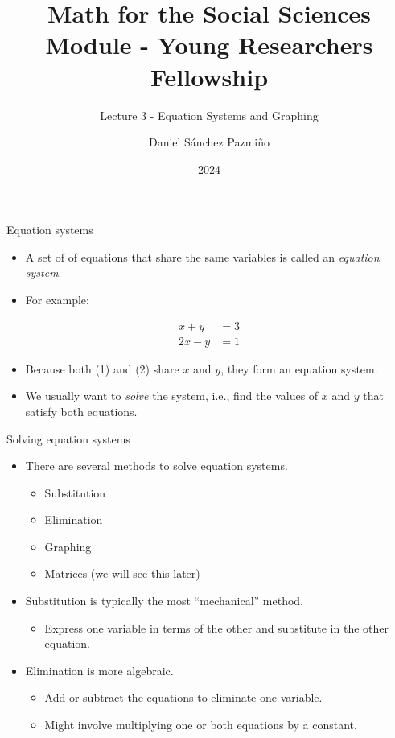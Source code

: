 \documentclass[
  10pt,
  ignorenonframetext,
]{beamer}
\title{Math for the Social Sciences Module - Young Researchers
Fellowship}
\subtitle{Lecture 3 - Equation Systems and Graphing}
\author{Daniel Sánchez Pazmiño}
\date{2024}
\institute{Laboratorio de Investigación para el Desarrollo del Ecuador}
\providecommand{\tightlist}{%
  \setlength{\itemsep}{0pt}\setlength{\parskip}{0pt}}\usepackage{longtable,booktabs,array}
\begin{document}
\frame{\titlepage}

\begin{frame}{Equation systems}
\label{equation-systems}
\begin{itemize}
\item
  A set of of equations that share the same variables is called an
  \emph{equation system}.
\item
  For example:
\end{itemize}

\begin{align}
x + y &= 3 \\
2x - y &= 1
\end{align}

\begin{itemize}
\item
  Because both (1) and (2) share \(x\) and \(y\), they form an equation
  system.
\item
  We usually want to \emph{solve} the system, i.e., find the values of
  \(x\) and \(y\) that satisfy both equations.
\end{itemize}
\end{frame}

\begin{frame}{Solving equation systems}
\label{solving-equation-systems}
\begin{itemize}
\tightlist
\item
  There are several methods to solve equation systems.

  \begin{itemize}
  \tightlist
  \item
    Substitution
  \item
    Elimination
  \item
    Graphing
  \item
    Matrices (we will see this later)
  \end{itemize}
\item
  Substitution is typically the most ``mechanical'' method.

  \begin{itemize}
  \tightlist
  \item
    Express one variable in terms of the other and substitute in the
    other equation.
  \end{itemize}
\item
  Elimination is more algebraic.

  \begin{itemize}
  \tightlist
  \item
    Add or subtract the equations to eliminate one variable.
  \item
    Might involve multiplying one or both equations by a constant.
  \end{itemize}
\end{itemize}
\end{frame}
\end{document}
